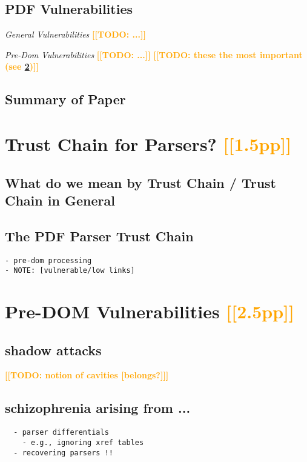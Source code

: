 \documentclass[conference,10pt]{IEEEtran}
\newcommand{\note}[1]{\noteYes{#1}}
\newcommand{\noteYes}[1]{\textbf{\textcolor{orange}{[[#1]]}}}
\newcommand{\todo}[1]{\note{TODO: #1}}
\begin{document}
\subsection{PDF Vulnerabilities}


\emph{General Vulnerabilities} \todo{...}

\emph{Pre-Dom Vulnerabilities} \todo{...}
\todo{these the most important (see \cref{sec:predom-vulnerabilities})}


\subsection{Summary of Paper}
      
\section{Trust Chain for Parsers? \note{1.5pp}}
\label{sec:trustchain}
\subsection{What do we mean by Trust Chain / Trust Chain in General}
\subsection{The PDF Parser Trust Chain}

\begin{lstlisting}
- pre-dom processing
- NOTE: [vulnerable/low links]
\end{lstlisting}

\section{Pre-DOM Vulnerabilities \note{2.5pp}}
\label{sec:predom-vulnerabilities}

\subsection{shadow attacks}
\todo{notion of cavities [belongs?]}

\subsection{schizophrenia arising from ...}
\begin{lstlisting}
  - parser differentials
    - e.g., ignoring xref tables
  - recovering parsers !!
\end{lstlisting}
\end{document}
